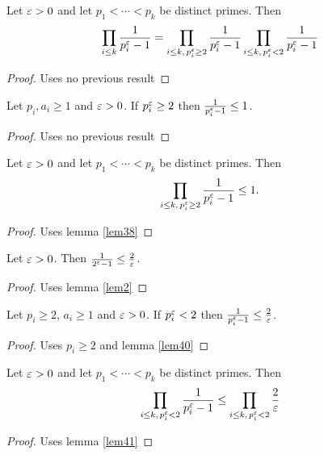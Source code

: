 \begin{lemma} \label{lem37} 
Let $\varepsilon>0$ and let $p_1<\cdots<p_k$ be distinct primes. Then
\[
\prod_{i\le k} \frac{1}{p_i^\varepsilon-1} = \prod_{i\le k, \, p_i^{\varepsilon}\ge 2} \frac{1}{p_i^\varepsilon-1}\prod_{i\le k, \, p_i^{\varepsilon}< 2} \frac{1}{p_i^\varepsilon-1}
\]
\end{lemma}
\begin{proof}\leanok
\uses{}
Uses no previous result
\end{proof}


\begin{lemma} \label{lem38} 
Let $p_i,a_i\ge1$ and $\varepsilon>0$. If $p_i^{\varepsilon}\ge 2$ then $\frac{1}{p_i^{\varepsilon}-1}\le 1$.
\end{lemma}
\begin{proof}\leanok
\uses{}
Uses no previous result
\end{proof}

\begin{lemma} \label{lem39} 
Let $\varepsilon>0$ and let $p_1<\cdots<p_k$ be distinct primes. Then
\[
\prod_{i\le k, \, p_i^{\varepsilon}\ge 2} \frac{1}{p_i^\varepsilon-1} \le 1.
\]
\end{lemma}
\begin{proof}\leanok
{}
Uses lemma \ref{lem38}
\end{proof}

\begin{lemma} \label{lem40} 
Let $\varepsilon>0$. Then $\frac{1}{2^{\varepsilon}-1} \le \frac{2}{\varepsilon}$.
\end{lemma}
\begin{proof}\leanok
{}
Uses lemma \ref{lem2}
\end{proof}

\begin{lemma} \label{lem41} 
Let $p_i\ge2$, $a_i\ge1$ and $\varepsilon>0$. If $p_i^{\varepsilon}< 2$ then $\frac{1}{p_i^{\varepsilon}-1} \le \frac{2}{\varepsilon}$.
\end{lemma}
\begin{proof}\leanok
{}
Uses $p_i\ge2$ and lemma \ref{lem40}
\end{proof}

\begin{lemma} \label{lem42} 
Let $\varepsilon>0$ and let $p_1<\cdots<p_k$ be distinct primes. Then
\[
\prod_{i\le k, \, p_i^{\varepsilon}< 2} \frac{1}{p_i^\varepsilon-1} \le 
\prod_{i\le k, \, p_i^{\varepsilon}< 2} \frac{2}{\varepsilon}
\]
\end{lemma}
\begin{proof}\leanok
{}
Uses lemma \ref{lem41}
\end{proof}

